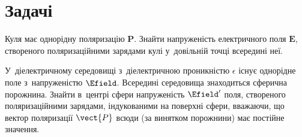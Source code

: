 \section*{Задачі}
 {}

\begin{problem}
	Куля має однорідну поляризацію $\mathbf{P}$. Знайти напруженість електричного поля
	$\mathbf{E}$, створеного поляризаційними зарядами кулі у~довільній точці всередині неї.
\end{problem}

\begin{problem}\label{prb:hole_in_dielectric}
	У~діелектричному середовищі з~діелектричною проникністю $\epsilon$ існує однорідне поле
	з~напруженістю $\Efield$. Всередині середовища знаходиться сферична порожнина. Знайти
	в~центрі сфери напруженість $\Efield'$ поля, створеного поляризаційними зарядами,
	індукованими на поверхні сфери, вважаючи, що вектор поляризації $\vect{P}$ всюди (за
	винятком порожнини) має постійне значення.
\end{problem}


